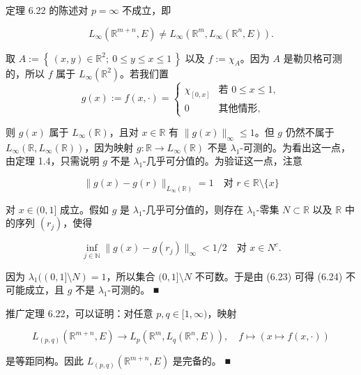 \begin{remark}

\begin{items}
\item

定理 6.22 的陈述对 $ p = \infty $ 不成立，即

\[
L_{\infty}(\mathbb{R}^{m+n},E) \ne L_{\infty}\left(\mathbb{R}^{m},L_{\infty}(\mathbb{R}^{n},E)\right) .
\]

\proofhead
取 $ A := \left\{\, (x,y) \in \mathbb{R}^{2} ;\ 0 \le y \le x \le 1 \,\right\} $ 以及 $ f := \chi_{A} $。因为 $ A $ 是勒贝格可测的，所以 $ f $ 属于 $ L_{\infty}(\mathbb{R}^{2}) $。若我们置
\begin{equation*}
g(x) := f(x,\cdot) = \begin{cases} \chi_{[0,x]} & \text{若 } 0 \le x \le 1 , \\ 0 & \text{其他情形} , \end{cases}
\end{equation*}

则 $ g(x) $ 属于 $ L_{\infty}(\mathbb{R}) $，且对 $ x \in \mathbb{R} $ 有 $ \|g(x)\|_{\infty} \le 1 $。但 $ g $ 仍然不属于 $ L_{\infty}\left(\mathbb{R},L_{\infty}(\mathbb{R})\right) $，因为映射 $ g: \mathbb{R} \to L_{\infty}(\mathbb{R}) $ 不是 $ \lambda_{1} $-可测的。为看出这一点，由定理 1.4，只需说明 $ g $ 不是 $ \lambda_{1} $-几乎可分值的。为验证这一点，注意

\begin{equation}
\|g(x)-g(r)\|_{L_{\infty}(\mathbb{R})} = 1 \quad \text{对 } r \in \mathbb{R}\setminus\{x\}\tag{6.23}
\end{equation}

对 $ x \in (0,1] $ 成立。假如 $ g $ 是 $ \lambda_{1} $-几乎可分值的，则存在 $ \lambda_{1} $-零集 $ N \subset \mathbb{R} $ 以及 $ \mathbb{R} $ 中的序列 $ (r_{j}) $，使得

\begin{equation}
\inf_{j \in \mathbb{N}}\|g(x)-g(r_{j})\|_{\infty} < 1/2 \quad \text{对 } x \in N^{c} .\tag{6.24}
\end{equation}

因为 $ \lambda_{1}((0,1]\setminus N) = 1 $，所以集合 $ (0,1]\setminus N $ 不可数。于是由 (6.23) 可得 (6.24) 不可能成立，且 $ g $ 不是 $ \lambda_{1} $-可测的。 \nobreak\hspace{0.35em}■

\item

推广定理 6.22，可以证明：对任意 $ p,q \in [1,\infty) $，映射

\[
L_{(p,q)}(\mathbb{R}^{m+n},E) \to L_{p}\left(\mathbb{R}^{m},L_{q}(\mathbb{R}^{n},E)\right) ,\quad f \mapsto (x \mapsto f(x,\cdot))
\]

是等距同构。因此 $ L_{(p,q)}(\mathbb{R}^{m+n},E) $ 是完备的。 \nobreak\hspace{0.35em}■

\end{items}

\end{remark}


